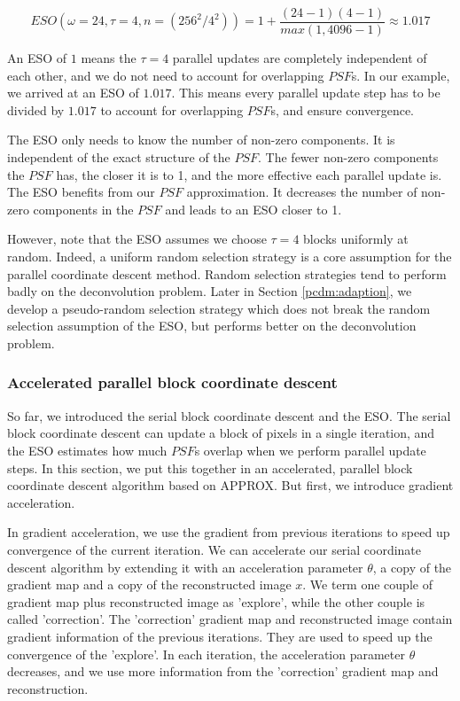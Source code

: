 \begin{equation}
ESO(\omega = 24, \tau = 4, n = (256^2 / 4^2)) = 1+ \frac{(24 - 1)(4 - 1)}{max(1, 4096 -1)} \approx 1.017
\end{equation}

An ESO of $1$ means the $\tau = 4$ parallel updates are completely independent of each other, and we do not need to account for overlapping $PSF$s. In our example, we arrived at an ESO of $1.017$. This means every parallel update step has to be divided by $1.017$ to account for overlapping $PSF$s, and ensure convergence.

The ESO only needs to know the number of non-zero components. It is independent of the exact structure of the $PSF$. The fewer non-zero components the $PSF$ has, the closer it is to 1, and the more effective each parallel update is. The ESO benefits from our $PSF$ approximation. It decreases the number of non-zero components in the $PSF$ and leads to an ESO closer to 1.

However, note that the ESO assumes we choose $\tau = 4$ blocks uniformly at random. Indeed, a uniform random selection strategy is a core assumption for the parallel coordinate descent method\cite{richtarik2016parallel}. Random selection strategies tend to perform badly on the deconvolution problem. Later in Section \ref{pcdm:adaption}, we develop a pseudo-random selection strategy which does not break the random selection assumption of the ESO, but performs better on the deconvolution problem.


\subsubsection{Accelerated parallel block coordinate descent} \label{pcdm:pcdm:approx}
So far, we introduced the serial block coordinate descent and the ESO. The serial block coordinate descent can update a block of pixels in a single iteration, and the ESO estimates how much $PSF$s overlap when we perform parallel update steps. In this section, we put this together in an accelerated, parallel block coordinate descent algorithm based on APPROX\cite{fercoq2015accelerated}. But first, we introduce gradient acceleration.

In gradient acceleration, we use the gradient from previous iterations to speed up convergence of the current iteration. We can accelerate our serial coordinate descent algorithm by extending it with an acceleration parameter $\theta$, a copy of the gradient map and a copy of the reconstructed image $x$.  We term one couple of gradient map plus reconstructed image as 'explore', while the other couple is called 'correction'. The 'correction' gradient map and reconstructed image contain gradient information of the previous iterations. They are used to speed up the convergence of the 'explore'. In each iteration, the acceleration parameter $\theta$ decreases, and we use more information from the 'correction' gradient map and reconstruction.

